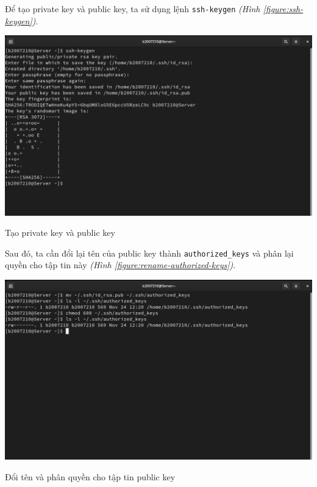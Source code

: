 \documentclass[a4paper, 11pt]{article}
\begin{document}
\begin{enumerate}
          Để tạo private key và public key, ta sử dụng lệnh \texttt{ssh-keygen} \textit{(Hình \ref{figure:ssh-keygen})}. \\
          \begin{minipage}
              {\linewidth}
              \captionsetup{type=figure}
              \centering
              \includegraphics[width=\linewidth]{images/ssh-keygen.png}
              \caption{Tạo private key và public key}
              \label{figure:ssh-keygen}
          \end{minipage}

          Sau đó, ta cần đổi lại tên của public key thành \texttt{authorized\_keys} và phân lại quyền cho tập tin này \textit{(Hình \ref{figure:rename-authorized-keys})}. \\
          \begin{minipage}
              {\linewidth}
              \captionsetup{type=figure}
              \centering
              \includegraphics[width=\linewidth]{images/rename-authorized-keys.png}
              \caption{Đổi tên và phân quyền cho tập tin public key}
              \label{figure:rename-authorized-keys}
          \end{minipage}


\end{enumerate}
\end{document}
